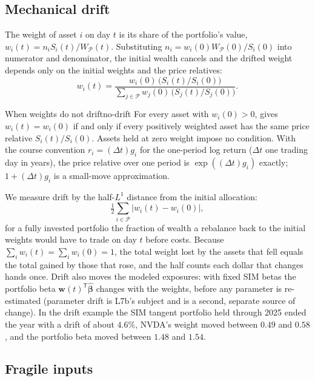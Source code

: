 \documentclass[11pt]{article}
\newcommand{\bw}{\mathbf w}
\newcommand{\bbe}{\boldsymbol\beta}
\newcommand{\WP}{W_{\mathcal P}}
\begin{document}
\subsection*{Mechanical drift}

The weight of asset $i$ on day $t$ is its share of the portfolio's value, $w_i(t)=n_iS_i(t)/\WP(t)$. Substituting $n_i=w_i(0)\WP(0)/S_i(0)$ into numerator and denominator, the initial wealth cancels and the drifted weight depends only on the initial weights and the price relatives:
\begin{equation}
  \label{eq:drift}
  w_i(t)=\frac{w_i(0)\,\bigl(S_i(t)/S_i(0)\bigr)}{\sum_{j\in\mathcal P}w_j(0)\,\bigl(S_j(t)/S_j(0)\bigr)}.
\end{equation}

\begin{proposition}{When weights do not drift}{no-drift}
For every asset with $w_i(0)>0$,  gives $w_i(t)=w_i(0)$ if and only if every positively weighted asset has the same price relative $S_i(t)/S_i(0)$. Assets held at zero weight impose no condition. With the course convention $r_{i}=(\Delta t)g_{i}$ for the one-period log return ($\Delta t$ one trading day in years), the price relative over one period is $\exp((\Delta t)g_i)$ exactly; $1+(\Delta t)g_i$ is a small-move approximation.
\end{proposition}

We measure drift by the half-$L^1$ distance from the initial allocation:
\begin{equation}
  \label{eq:half-l1}
  \tfrac12\sum_{i\in\mathcal P}\lvert w_i(t)-w_i(0)\rvert,
\end{equation}
for a fully invested portfolio the fraction of wealth a rebalance back to the initial weights would have to trade on day $t$ before costs. Because $\sum_i w_i(t)=\sum_i w_i(0)=1$, the total weight lost by the assets that fell equals the total gained by those that rose, and the half counts each dollar that changes hands once. Drift also moves the modeled exposures: with fixed SIM betas the portfolio beta $\bw(t)^{\mathsf T}\hat{\bbe}$ changes with the weights, before any parameter is re-estimated (parameter drift is L7b's subject and is a second, separate source of change). In the drift example the SIM tangent portfolio held through 2025 ended the year with a drift of about $4.6\%$, NVDA's weight moved between $0.49$ and $0.58$, and the portfolio beta moved between $1.48$ and $1.54$.

\subsection*{Fragile inputs}
\end{document}
